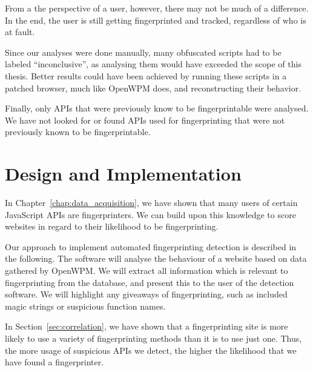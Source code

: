 \documentclass[
    fontsize=12pt,
    headings=small,
    parskip=half,
    bibliography=totoc,
    numbers=noenddot,
    open=any
    ]{scrreprt}
\begin{document}
From a the perspective of a user, however, there may not be much of a difference.
In the end, the user is still getting fingerprinted and tracked, regardless
of who is at fault.

Since our analyses were done manually, many obfuscated scripts had to be labeled
``inconclusive'', as analysing them would have exceeded the scope of this thesis.
Better results could have been achieved by running these scripts in a patched
browser, much like OpenWPM does, and reconstructing their behavior.

Finally, only APIs that were previously know to be fingerprintable were analysed.
We have not looked for or found APIs used for fingerprinting that were not previously
known to be fingerprintable.




\chapter{Design and Implementation}
\label{chap:implementation}
In Chapter~\ref{chap:data_acquisition}, we have shown that many users of certain JavaScript APIs are fingerprinters.
We can build upon this knowledge to score websites in regard to their likelihood to be fingerprinting.

Our approach to implement automated fingerprinting detection is described in the following.
The software will analyse the behaviour of a website based on data gathered by OpenWPM.
We will extract all information which is relevant to fingerprinting from the database,
and present this to the user of the detection software.
We will highlight any giveaways of fingerprinting, such as included magic strings
or suspicious function names.

In Section~\ref{sec:correlation}, we have shown that a fingerprinting site is more
likely to use a variety of fingerprinting methods than it is to use just one.
Thus, the more usage of suspicious APIs we detect, the higher the likelihood
that we have found a fingerprinter.
\end{document}
